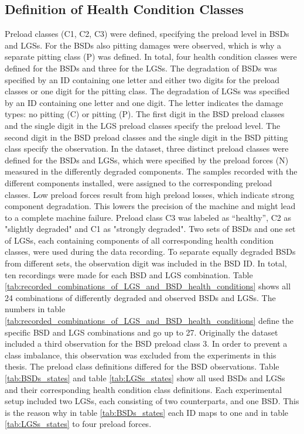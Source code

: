 \subsection{Definition of Health Condition Classes}
Preload classes (C1, C2, C3) were defined, specifying the preload level in BSDs and LGSs. For the BSDs also pitting damages were observed, which is why a separate pitting class (P) was defined. In total, four health condition classes were defined for the BSDs and three for the LGSs. The degradation of BSDs was specified by an ID containing one letter and either two digits for the preload classes or one digit for the pitting class. The degradation of LGSs was specified by an ID containing one letter and one digit. The letter indicates the damage types: no pitting (C) or pitting (P). The first digit in the BSD preload classes and the single digit in the LGS preload classes specify the preload level. The second digit in the BSD preload classes and the single digit in the BSD pitting class specify the observation. In the dataset, three distinct preload classes were defined for the BSDs and LGSs, which were specified by the preload forces (N) measured in the differently degraded components. The samples recorded with the different components installed, were assigned to the corresponding preload classes. Low preload forces result from high preload losses, which indicate strong component degradation. This lowers the precision of the machine and might lead to a complete machine failure. Preload class C3 was labeled as “healthy”, C2 as "slightly degraded" and C1 as "strongly degraded". Two sets of BSDs and one set of LGSs, each containing components of all corresponding health condition classes, were used during the data recording. To separate equally degraded BSDs from different sets, the observation digit was included in the BSD ID. In total, ten recordings were made for each BSD and LGS combination. Table \ref{tab:recorded_combinations_of_LGS_and_BSD_health_conditions} shows all 24 combinations of differently degraded and observed BSDs and LGSs. The numbers in table \ref{tab:recorded_combinations_of_LGS_and_BSD_health_conditions} define the specific BSD and LGS combinations and go up to 27. Originally the dataset included a third observation for the BSD preload class 3. In order to prevent a class imbalance, this observation was excluded from the experiments in this thesis. The preload class definitions differed for the BSD observations. Table \ref {tab:BSDs_states} and table \ref {tab:LGSs_states} show all used BSDs and LGSs and their corresponding health condition class definitions. Each experimental setup included two LGSs, each consisting of two counterparts, and one BSD. This is the reason why in table \ref {tab:BSDs_states} each ID maps to one and in table \ref {tab:LGSs_states} to four preload forces.

